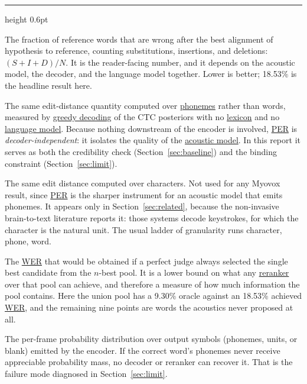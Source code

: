 \documentclass{article}
\providecommand{\textls}[2][]{#2}
\newcommand{\cathead}[1]{%
  \par\addvspace{15pt}\needspace{5\baselineskip}%
  \noindent{\normalsize\scshape\bfseries\textls[70]{#1}}\par
  \vspace{2.5pt}%
  {\color{rulegray}\hrule height 0.6pt}%
  \par\addvspace{8pt}%
}
\DeclareRobustCommand{\glref}[2]{\hyperlink{gl:#1}{\textcolor{glosslink}{#2}}}
\newcommand{\glentry}[2]{\item[\hypertarget{gl:#1}{#2}]}
\newenvironment{glosslist}
  {\begin{description}[style=nextline,leftmargin=2.1em,labelindent=0pt,
      itemsep=5pt,parsep=0pt,topsep=2pt,font=\normalfont\bfseries]}
  {\end{description}}
\DeclareRobustCommand{\wer}{\glref{wer}{WER}}
\DeclareRobustCommand{\per}{\glref{per}{PER}}
\begin{document}
\cathead{Metrics}
\begin{glosslist}

\glentry{wer}{WER \textnormal{(word error rate)}}
The fraction of reference words that are wrong after the best alignment of hypothesis to reference,
counting substitutions, insertions, and deletions: $(S+I+D)/N$. It is the reader-facing number, and it
depends on the acoustic model, the decoder, and the language model together. Lower is better; 18.53\%
is the headline result here.

\glentry{per}{PER \textnormal{(phone error rate)}}
The same edit-distance quantity computed over \glref{phoneme}{phonemes} rather than words, measured by
\glref{greedy}{greedy decoding} of the CTC posteriors with no \glref{lexicon}{lexicon} and no
\glref{lm}{language model}. Because nothing downstream of the encoder is involved, \per{} is
\emph{decoder-independent}: it isolates the quality of the \glref{am}{acoustic model}. In this report
it serves as both the credibility check (Section~\ref{sec:baseline}) and the binding constraint
(Section~\ref{sec:limit}).

\glentry{cer}{CER \textnormal{(character error rate)}}
The same edit distance computed over characters. Not used for any Myovox result, since \per{} is the
sharper instrument for an acoustic model that emits phonemes. It appears only in
Section~\ref{sec:related}, because the non-invasive brain-to-text literature reports it: those systems
decode keystrokes, for which the character is the natural unit. The usual ladder of granularity runs
character, phone, word.

\glentry{oracle}{Oracle WER \textnormal{($n$-best oracle)}}
The \wer{} that would be obtained if a perfect judge always selected the single best candidate from
the $n$-best pool. It is a lower bound on what any \glref{rerank}{reranker} over that pool can achieve,
and therefore a measure of how much information the pool contains. Here the union pool has a 9.30\%
oracle against an 18.53\% achieved \wer{}, and the remaining nine points are words the acoustics never
proposed at all.

\glentry{posterior}{Acoustic posterior}
The per-frame probability distribution over output symbols (phonemes, units, or blank) emitted by the
encoder. If the correct word's phonemes never receive appreciable probability mass, no decoder or
reranker can recover it. That is the failure mode diagnosed in Section~\ref{sec:limit}.

\end{glosslist}
\end{document}

